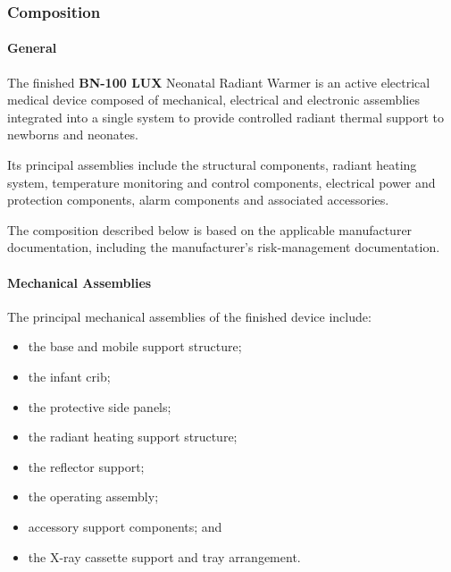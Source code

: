 ﻿

\hypertarget{p3-3-2-2}{}

\subsubsection{Composition}

\paragraph{General}

The finished \textbf{BN-100 LUX} Neonatal Radiant Warmer is an
active electrical medical device composed of mechanical, electrical
and electronic assemblies integrated into a single system to provide
controlled radiant thermal support to newborns and neonates.

Its principal assemblies include the structural components, radiant
heating system, temperature monitoring and control components,
electrical power and protection components, alarm components and
associated accessories.

The composition described below is based on the applicable
manufacturer documentation, including the manufacturer's
risk-management documentation.


\paragraph{Mechanical Assemblies}

The principal mechanical assemblies of the finished device include:

\begin{itemize}
    \item the base and mobile support structure;
    \item the infant crib;
    \item the protective side panels;
    \item the radiant heating support structure;
    \item the reflector support;
    \item the operating assembly;
    \item accessory support components; and
    \item the X-ray cassette support and tray arrangement.
\end{itemize}

